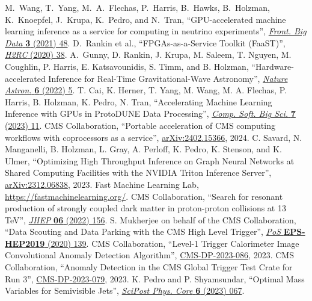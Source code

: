 \begin{thebibliography}{99}
 M.~Wang, T.~Yang, M.~A.~Flechas, P.~Harris, B.~Hawks, B.~Holzman, K.~Knoepfel, J.~Krupa, K.~Pedro, and N.~Tran, ``GPU-accelerated machine learning inference as a service for computing in neutrino experiments'', \href{https://doi.org/10.3389/fdata.2020.604083}{\textit{Front. Big Data} \textbf{3} (2021) 48}.
 D.~Rankin et al., ``FPGAs-as-a-Service Toolkit (FaaST)'', \href{https://doi.org/10.1109/H2RC51942.2020.00010}{\textit{H2RC} (2020) 38}.
 A.~Gunny, D. Rankin, J. Krupa, M. Saleem, T. Nguyen, M. Coughlin, P. Harris, E. Katsavounidis, S. Timm, and B. Holzman, ``Hardware-accelerated Inference for Real-Time Gravitational-Wave Astronomy'', \href{https://doi.org/10.1038/s41550-022-01651-w}{\textit{Nature Astron.} \textbf{6} (2022) 5}.
 T. Cai, K. Herner, T. Yang, M. Wang, M. A. Flechas, P. Harris, B. Holzman, K. Pedro, N. Tran, ``Accelerating Machine Learning Inference with GPUs in ProtoDUNE Data Processing'', \href{https://doi.org/10.1007/s41781-023-00101-0}{\textit{Comp. Soft. Big Sci.} \textbf{7} (2023) 11}.
 CMS Collaboration, ``Portable acceleration of CMS computing workflows with coprocessors as a service'', \href{https://arxiv.org/abs/2402.15366}{arXiv:2402.15366}, 2024.
 C. Savard, N. Manganelli, B. Holzman, L. Gray, A. Perloff, K. Pedro, K. Stenson, and K. Ulmer, ``Optimizing High Throughput Inference on Graph Neural Networks at Shared Computing Facilities with the NVIDIA Triton Inference Server'', \href{https://arxiv.org/abs/2312.06838}{arXiv:2312.06838}, 2023.
 Fast Machine Learning Lab, \href{https://fastmachinelearning.org/}{https://fastmachinelearning.org/}.
 CMS Collaboration, ``Search for resonant production of strongly coupled dark matter in proton-proton collisions at 13 TeV'', \href{https://doi.org/10.1007/JHEP06(2022)156}{\textit{JHEP} \textbf{06} (2022) 156}.
 S. Mukherjee on behalf of the CMS Collaboration, ``Data Scouting and Data Parking with the CMS High Level Trigger'', \href{https://doi.org/10.22323/1.364.0139}{\textit{PoS} \textbf{EPS-HEP2019} (2020) 139}.
 CMS Collaboration, ``Level-1 Trigger Calorimeter Image Convolutional Anomaly Detection Algorithm'', \href{http://cds.cern.ch/record/2879816}{CMS-DP-2023-086}, 2023.
 CMS Collaboration, ``Anomaly Detection in the CMS Global Trigger Test Crate for Run 3'', \href{http://cds.cern.ch/record/2876546}{CMS-DP-2023-079}, 2023.
 K. Pedro and P. Shyamsundar, ``Optimal Mass Variables for Semivisible Jets'', \href{https://doi.org/10.21468/SciPostPhysCore.6.4.067}{\textit{SciPost Phys. Core} \textbf{6} (2023) 067}.

\end{thebibliography}
